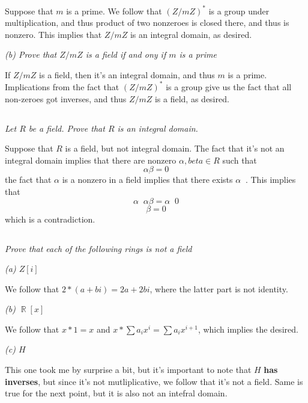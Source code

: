\documentclass[11pt,oneside,titlepage]{book}
\DeclareMathOperator \real {\mathbb {R}}
\DeclareMathOperator \inv {^{-1}}
\begin{document}
Suppose that $m$ is a prime. We follow that $(Z/mZ)^*$ is a group
under multiplication, and thus product of two nonzeroes is closed
there, and thus is nonzero. This implies that $Z/mZ$ is an integral
domain, as desired.

\textit{(b) Prove that $Z/mZ$ is a field if and ony if $m$ is a prime}

If $Z/mZ$ is a field, then it's an integral domain, and thus $m$ is a
prime.  Implications from the fact that $(Z/mZ)^*$ is a group give us
the fact that all non-zeroes got inverses, and thus $Z/mZ$ is a field,
as desired.

\subsection{}

\textit{Let $R$ be a field. Prove that $R$ is an integral domain.}

Suppose that $R$ is a field, but not integral domain. The fact that
it's not an integral domain implies that there are nonzero $\alpha,
beta \in R$ such that
$$\alpha \beta = 0$$
the fact that $\alpha$ is a nonzero in a field implies that there
exists $\alpha \inv$.  This implies that
$$\alpha \inv \alpha \beta = \alpha \inv 0 $$
$$ \beta =  0 $$
which is a contradiction.

\subsection{}

\textit{Prove that each of the following rings is not a field}

\textit{(a) $Z[i]$}

We follow that $2 * (a + bi) = 2a + 2bi$, where the latter part is not
identity.

\textit{(b) $\real[x]$}

We follow that $x * 1 = x$ and $x * \sum{a_i x^i} = \sum{a_i x^{i +
1}}$, which implies the desired.

\textit{(c) $H$}

This one took me by surprise a bit, but it's important to note that
$H$ \textbf{has inverses}, but since it's not mutliplicative, we
follow that it's not a field. Same is true for the next point, but it
is also not an intefral domain.

\subsection{}
\end{document}
